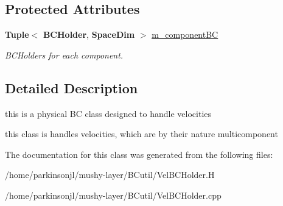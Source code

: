 \subsection*{Protected Attributes}
\begin{DoxyCompactItemize}
\item 
\mbox{\label{class_vel_b_c_holder_a96bc0178395c31ab7ecc41538f63f457}} 
\textbf{ Tuple}$<$ \textbf{ B\+C\+Holder}, \textbf{ Space\+Dim} $>$ \hyperlink{class_vel_b_c_holder_a96bc0178395c31ab7ecc41538f63f457}{m\+\_\+component\+BC}
\begin{DoxyCompactList}\small\item\em B\+C\+Holders for each component. \end{DoxyCompactList}\end{DoxyCompactItemize}


\subsection{Detailed Description}
this is a physical BC class designed to handle velocities 

this class is handles velocities, which are by their nature multicomponent 

The documentation for this class was generated from the following files\+:\begin{DoxyCompactItemize}
\item 
/home/parkinsonjl/mushy-\/layer/\+B\+Cutil/Vel\+B\+C\+Holder.\+H\item 
/home/parkinsonjl/mushy-\/layer/\+B\+Cutil/Vel\+B\+C\+Holder.\+cpp\end{DoxyCompactItemize}
